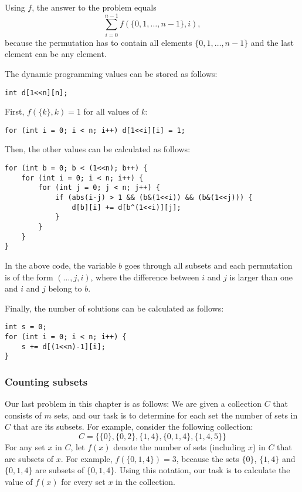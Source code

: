 Using $f$, the answer to the problem equals
\[ \sum_{i=0}^{n-1} f(\{0,1,\ldots,n-1\},i), \]
because the permutation has to contain all
elements $\{0,1,\ldots,n-1\}$ and the last
element can be any element.

The dynamic programming values can be stored as follows:
\begin{lstlisting}
int d[1<<n][n];
\end{lstlisting}

First, $f(\{k\},k)=1$ for all values of $k$:
\begin{lstlisting}
for (int i = 0; i < n; i++) d[1<<i][i] = 1;
\end{lstlisting}

Then, the other values can be calculated
as follows:
\begin{lstlisting}
for (int b = 0; b < (1<<n); b++) {
    for (int i = 0; i < n; i++) {
        for (int j = 0; j < n; j++) {
            if (abs(i-j) > 1 && (b&(1<<i)) && (b&(1<<j))) {
                d[b][i] += d[b^(1<<i)][j];
            }
        }
    }
}
\end{lstlisting}

In the above code,
the variable $b$ goes through all subsets and each
permutation is of the form $(\ldots,j,i)$,
where the difference between $i$ and $j$ is
larger than one and $i$ and $j$ belong to $b$.

Finally, the number of solutions can be
calculated as follows:

\begin{lstlisting}
int s = 0;
for (int i = 0; i < n; i++) {
    s += d[(1<<n)-1][i];
}
\end{lstlisting}

\subsubsection{Counting subsets}

Our last problem in this chapter is as follows:
We are given a collection $C$ that consists of $m$ sets,
and our task is to determine for each set
the number of sets in $C$ that are its subsets.
For example, consider the following collection:
\[C = \{\{0\}, \{0,2\}, \{1,4\}, \{0,1,4\}, \{1,4,5\}\}\]
For any set $x$ in $C$,
let $f(x)$ denote the number of sets (including $x$) in $C$
that are subsets of $x$.
For example, $f(\{0,1,4\})=3$, because the
sets $\{0\}$, $\{1,4\}$ and $\{0,1,4\}$ are
subsets of $\{0,1,4\}$.
Using this notation, our task is to calculate the value of $f(x)$
for every set $x$ in the collection.


